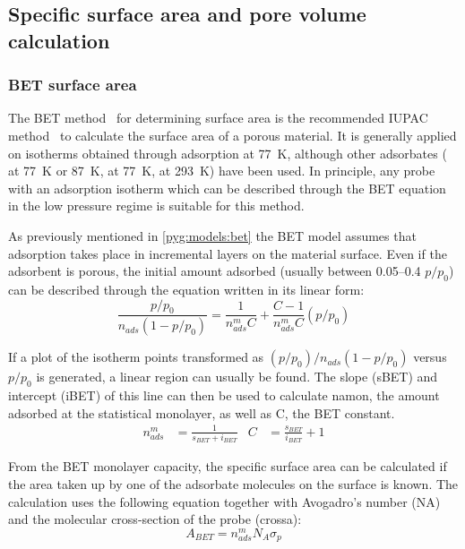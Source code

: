 
\subsection{Specific surface area and pore volume calculation}

\subsubsection{BET surface area}\label{pyg:charac:betarea}

The \gls{BET} method~\cite{brunauerAdsorptionGasesMultimolecular1938}
for determining surface area is the recommended \gls{IUPAC}
method~\cite{thommesPhysisorptionGasesSpecial2015}
to calculate the surface area of a porous material.
It is generally applied on isotherms obtained through 
adsorption at \SI{77}{\kelvin}, although other adsorbates
( at \SI{77}{\kelvin} or \SI{87}{\kelvin},
 at \SI{77}{\kelvin},  at \SI{293}{\kelvin})
have been used. In principle, any probe with an adsorption isotherm
which can be described through the \gls{BET} equation in the low pressure regime
is suitable for this method.

As previously mentioned in \autoref{pyg:models:bet} the \gls{BET} model assumes
that adsorption takes place in incremental layers on the material
surface. Even if the adsorbent is porous, the initial amount adsorbed
(usually between 0.05--0.4 \(p/p_0\)) can be
described through the equation written in its linear form:
%
\begin{equation}
	\frac{p/p_0}{n_{ads} (1-p/p_0)} = \frac{1}{n_{ads}^m C} + \frac{C - 1}{n_{ads}^m C}(p/p_0)
\end{equation}

If a plot of the isotherm points transformed as \({(p/p_0)}/{n_{ads}(1-p/p_0)}\)
versus \(p/p_0\) is generated, a linear region
can usually be found. The slope (\gls{sBET}) and intercept (\gls{iBET}) 
of this line can then be used to calculate \gls{namon}, the amount 
adsorbed at the
statistical monolayer, as well as \gls{C}, the \gls{BET} constant.
%
\begin{align}
	n_{ads}^{m} & = \frac{1}{s_{BET}+i_{BET}} & C & = \frac{s_{BET}}{i_{BET}} + 1
\end{align}

From the \gls{BET} monolayer capacity, the specific surface area can be
calculated if the area taken up by one of the adsorbate molecules
on the surface is known. The calculation uses the following equation
together with Avogadro's number (\gls{NA}) and the molecular cross-section 
of the probe (\gls{crossa}):
%
\begin{equation}
	A_{BET} = n_{ads}^m N_A \sigma_p
\end{equation}

